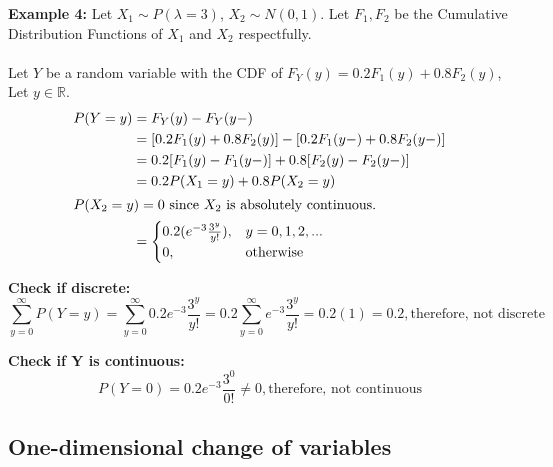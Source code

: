 \documentclass[12pt, twoside]{article}
\begin{document}
\textbf{Example 4:} Let $X_1 \sim P(\lambda = 3)$, $X_2 \sim N(0,1)$. Let $F_1, F_2$ be the Cumulative Distribution Functions of $X_1$ and $X_2$ respectfully.\\
\\
Let $Y$ be a random variable with the CDF of $F_Y (y) = 0.2 F_1 (y) + 0.8 F_2 (y)$, Let $y\in\mathbb{R}$.
\begin{align*}
	P(Y = y) &= F_Y (y) - F_Y (y-)\\
	&= [0.2 F_1 (y) + 0.8 F_2 (y)] - [0.2 F_1 (y-) + 0.8 F_2 (y-)]\\
&= 0.2 [F_1 (y) - F_1 (y-)] + 0.8 [F_2 (y) - F_2 (y-)]\\
&= 0.2 P(X_1 = y) + 0.8 P(X_2 = y)\\
\shortintertext{$P(X_2 = y) = 0$ since $X_2$ is absolutely continuous.}
	&= \begin{cases}
0.2(e^{-3} \frac{3^y}{y!}), & y = 0,1,2,...\\
0, & \text{otherwise}
\end{cases}
\end{align*}

\textbf{Check if discrete:} $$\sum^\infty_{y=0} P(Y = y) = \sum^\infty_{y=0} 0.2 e^{-3} \frac{3^y}{y!} = 0.2 \sum^\infty_{y=0} e^{-3} \frac{3^y}{y!} = 0.2(1) = 0.2, \text{therefore, not discrete}$$

\textbf{Check if Y is continuous:} $$P(Y = 0) = 0.2 e^{-3} \frac{3^0}{0!} \neq 0, \text{therefore, not continuous}$$

\subsection{One-dimensional change of variables}
\end{document}
